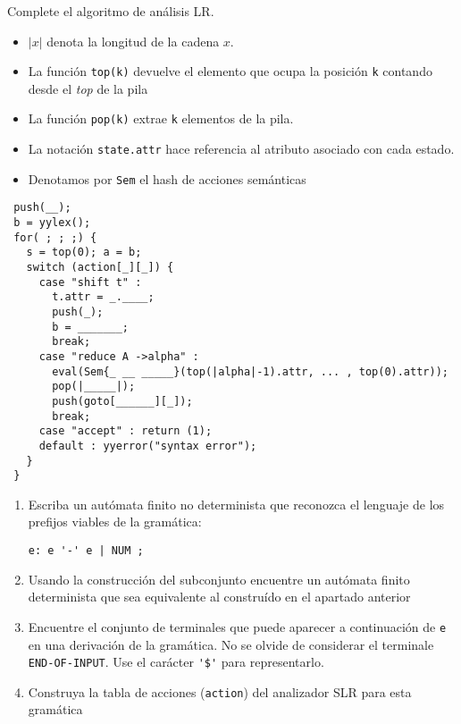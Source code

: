 \item 
Complete el algoritmo de análisis LR.
\begin{itemize}
\item
$|x|$ denota la longitud de la cadena $x$. 
\item
La función \verb|top(k)| devuelve el elemento que ocupa la 
posición \verb|k| contando desde el \emph{top} de la pila
\item
La función \verb|pop(k)| extrae \verb|k| elementos de la pila.
\item
La notación \verb|state.attr| hace referencia al atributo
asociado con cada estado.
\item Denotamos por \verb|Sem| el hash de acciones semánticas
\end{itemize}
\begin{verbatim}
 push(__);
 b = yylex();
 for( ; ; ;) {
   s = top(0); a = b;
   switch (action[_][_]) {
     case "shift t" : 
       t.attr = _.____;
       push(_); 
       b = _______;
       break;
     case "reduce A ->alpha" : 
       eval(Sem{_ __ _____}(top(|alpha|-1).attr, ... , top(0).attr)); 
       pop(|_____|); 
       push(goto[______][_]); 
       break;
     case "accept" : return (1); 
     default : yyerror("syntax error");
   }
 }
\end{verbatim}
\item 
\begin{enumerate}
\item 
Escriba un autómata finito no determinista que reconozca el lenguaje 
de los prefijos viables de la gramática:
\begin{verbatim}
e: e '-' e | NUM ;
\end{verbatim}
\item 
Usando la construcción del subconjunto encuentre un autómata finito determinista que sea equivalente al construído en el apartado anterior
\item
Encuentre el conjunto de terminales que puede aparecer a continuación de 
\verb|e| en una derivación de la gramática. No se olvide de considerar el terminale \verb|END-OF-INPUT|. Use el carácter \verb|'$'| para representarlo.
\item
Construya la tabla de acciones (\verb|action|) del analizador SLR para esta gramática
\end{enumerate}

